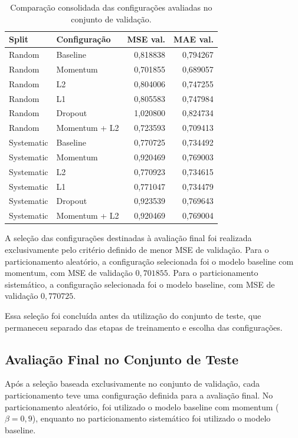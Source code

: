 \documentclass[11pt,a4paper]{article}
\begin{document}
\begin{table}[H]
\centering
\small
\caption{Comparação consolidada das configurações avaliadas no conjunto
de validação.}
\label{tab:ablation_comparison}
\begin{tabular}{llrr}
\toprule
\textbf{Split} &
\textbf{Configuração} &
\textbf{MSE val.} &
\textbf{MAE val.} \\
\midrule
Random & Baseline & 0,818838 & 0,794267 \\
Random & Momentum & 0,701855 & 0,689057 \\
Random & L2 & 0,804006 & 0,747255 \\
Random & L1 & 0,805583 & 0,747984 \\
Random & Dropout & 1,020800 & 0,824734 \\
Random & Momentum + L2 & 0,723593 & 0,709413 \\
\midrule
Systematic & Baseline & 0,770725 & 0,734492 \\
Systematic & Momentum & 0,920469 & 0,769003 \\
Systematic & L2 & 0,770923 & 0,734615 \\
Systematic & L1 & 0,771047 & 0,734479 \\
Systematic & Dropout & 0,923539 & 0,769643 \\
Systematic & Momentum + L2 & 0,920469 & 0,769004 \\
\bottomrule
\end{tabular}
\end{table}

A seleção das configurações destinadas à avaliação final foi realizada
exclusivamente pelo critério definido de menor MSE de validação. Para
o particionamento aleatório, a configuração selecionada foi o modelo
baseline com momentum, com MSE de validação $0,701855$. Para o
particionamento sistemático, a configuração selecionada foi o modelo
baseline, com MSE de validação $0,770725$.

Essa seleção foi concluída antes da utilização do conjunto de teste,
que permaneceu separado das etapas de treinamento e escolha das
configurações.


\subsection{Avaliação Final no Conjunto de Teste}

Após a seleção baseada exclusivamente no conjunto de validação, cada
particionamento teve uma configuração definida para a avaliação final.
No particionamento aleatório, foi utilizado o modelo baseline com
momentum ($\beta=0,9$), enquanto no particionamento sistemático foi
utilizado o modelo baseline.
\end{document}
